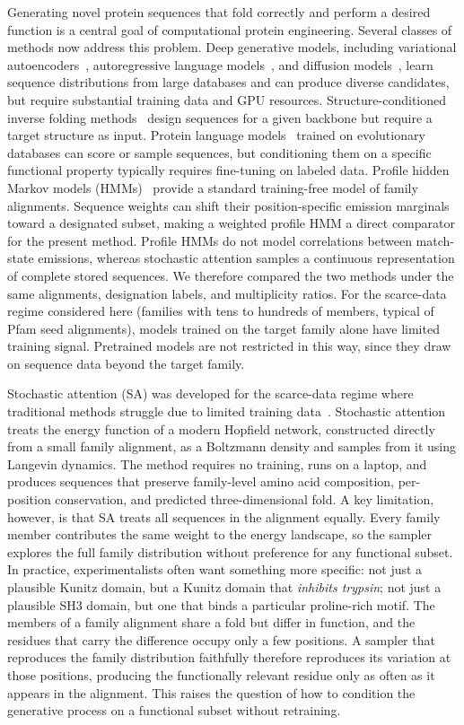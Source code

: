 Generating novel protein sequences that fold correctly and perform a desired function is a
central goal of computational protein engineering. Several classes of methods now address this
problem. Deep generative models, including variational autoencoders~\cite{hawkinsHookerVAE2021},
autoregressive language models~\cite{madaniProGen2023}, and diffusion
models~\cite{alamdariProteinGeneration2023}, learn sequence distributions from large databases
and can produce diverse candidates, but require substantial training data and GPU resources.
Structure-conditioned inverse folding methods~\cite{dauparasProteinMPNN2022} design sequences for
a given backbone but require a target structure as input. Protein language
models~\cite{esmfold2022} trained on evolutionary databases can score or sample sequences, but
conditioning them on a specific functional property typically requires fine-tuning on labeled
data. Profile hidden Markov models (HMMs)~\cite{hmmer3} provide a standard training-free model
of family alignments. Sequence weights can shift their position-specific emission marginals
toward a designated subset, making a weighted profile HMM a direct comparator for the present
method. Profile HMMs do not model correlations between match-state emissions, whereas
stochastic attention samples a continuous representation of complete stored sequences. We
therefore compared the two methods under the same alignments, designation labels, and multiplicity ratios. For the
scarce-data regime considered here (families with tens to hundreds of members, typical of Pfam
seed alignments), models trained on the target family alone have limited training signal.
Pretrained models are not restricted in this way, since they draw on sequence data beyond the
target family.

Stochastic attention (SA) was developed for the scarce-data regime where traditional methods struggle due to limited training data~\cite{varnerSAProtein2026}. Stochastic attention treats the energy function of a modern Hopfield network, constructed directly from a small family alignment, as a Boltzmann density and samples from it using Langevin dynamics. The method requires no training, runs on a laptop, and produces sequences that preserve family-level amino acid composition, per-position conservation, and predicted three-dimensional fold. A key
limitation, however, is that SA treats all sequences in the alignment equally. Every family
member contributes the same weight to the energy landscape, so the sampler explores the full
family distribution without preference for any functional subset. In practice, experimentalists
often want something more specific: not just a plausible Kunitz domain, but a Kunitz domain
that \emph{inhibits trypsin}; not just a plausible SH3 domain, but one that binds a
particular proline-rich motif. The members of a family alignment share a fold but differ in
function, and the residues that carry the difference occupy only a few positions. A sampler
that reproduces the family distribution faithfully therefore reproduces its variation at those
positions, producing the functionally relevant residue only as often as it appears in the
alignment. This raises the question of how to condition the generative process on a functional
subset without retraining.

